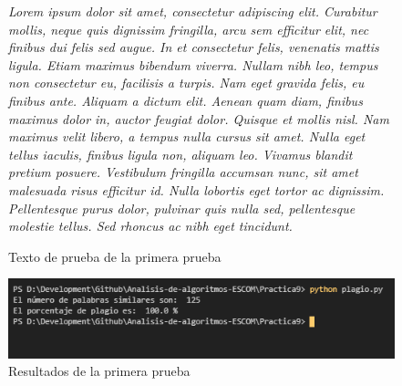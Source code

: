 \documentclass[12pt,twoside]{article}
\begin{document}
\begin{figure}
    \centering
    \textit{Lorem ipsum dolor sit amet, consectetur adipiscing elit. 
Curabitur mollis, neque quis dignissim fringilla, arcu sem 
efficitur elit, nec finibus dui felis sed augue. In et consectetur 
felis, venenatis mattis ligula. Etiam maximus bibendum viverra. 
Nullam nibh leo, tempus non consectetur eu, facilisis a turpis. 
Nam eget gravida felis, eu finibus ante. Aliquam a dictum elit. 
Aenean quam diam, finibus maximus dolor in, auctor feugiat dolor. 
Quisque et mollis nisl. Nam maximus velit libero, a tempus nulla 
cursus sit amet. Nulla eget tellus iaculis, finibus ligula non, 
aliquam leo. Vivamus blandit pretium posuere. Vestibulum fringilla 
accumsan nunc, sit amet malesuada risus efficitur id. Nulla 
lobortis eget tortor ac dignissim. Pellentesque purus dolor, 
pulvinar quis nulla sed, pellentesque molestie tellus. Sed rhoncus 
ac nibh eget tincidunt.}
    \caption{Texto de prueba de la primera prueba}
    \label{fig:texto12}
\end{figure}

\begin{figure}[ht]
    \centering
    \includegraphics[width=1\textwidth]{1.png}
    \caption{Resultados de la primera prueba} 
    \label{fig:primera}
\end{figure}
\end{document}
